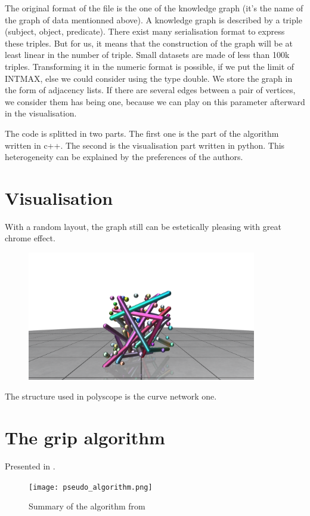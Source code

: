 \documentclass{article}
\begin{document}
The original format of the file is the one of the knowledge graph (it's the name of the graph of data mentionned above). A knowledge graph is described by a triple (subject, object, predicate). There exist many serialisation format to express these triples. But for us, it means that the construction of the graph will be at least linear in the number of triple. Small datasets are made of less than 100k triples. Transforming it in the numeric format is possible, if we put the limit of INT\textunderscore MAX, else we could consider using the type double. We store the graph in the form of adjacency lists. If there are several edges between a pair of vertices, we consider them has being one, because we can play on this parameter afterward in the visualisation. 

The code is splitted in two parts. The first one is the part of the algorithm written in c++. The second is the visualisation part written in python. This heterogeneity can be explained by the preferences of the authors.

 


\section{Visualisation}
With a random layout, the graph still can be estetically pleasing with great chrome effect. 
\begin{figure}[h!]
    \includegraphics[width=10cm]{random_generator.png}
\end{figure}
The structure used in polyscope is the curve network one.

\section{The grip algorithm}

Presented in \cite{gajer00}.
\begin{figure}[h!]
    \texttt{[image: pseudo\_algorithm.png]}
    \caption{Summary of the algorithm from \cite{gajer00}}
\end{figure} 
\end{document}
